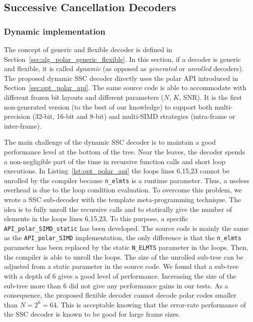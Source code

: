 \subsection{Successive Cancellation Decoders}

\subsubsection{Dynamic implementation}

The concept of generic and flexible decoder is defined in
Section~\ref{sec:alg_polar_generic_flexible}. In this section, if a decoder is
generic and flexible, it is called \emph{dynamic} (as opposed as
\emph{generated} or \emph{unrolled} decoders). The proposed dynamic SSC decoder
directly uses the polar API introduced in Section~\ref{sec:opt_polar_api}. The
same source code is able to accommodate with different frozen bit layouts and
different parameters ($N$, $K$, SNR). It is the first non-generated version (to
the best of our knowledge) to support both multi-precision (32-bit, 16-bit and
8-bit) and multi-SIMD strategies (intra-frame or inter-frame).

The main challenge of the dynamic SSC decoder is to maintain a good performance
level at the bottom of the tree. Near the leaves, the decoder spends a
non-negligible part of the time in recursive function calls and short loop
executions. In Listing~\ref{lst:opt_polar_api} the loops lines 6,15,23 cannot
be unrolled by the compiler because \verb|n_elmts| is a runtime parameter. Thus,
a useless overhead is due to the loop condition evaluation. To overcome this
problem, we wrote a SSC sub-decoder with the template meta-programming
technique. The idea is to fully unroll the recursive calls and to statically
give the number of elements in the loops lines 6,15,23. To this purpose, a
specific \verb|API_polar_SIMD_static| has been developed. The source code is
mainly the same as the \verb|API_polar_SIMD| implementation, the only difference
is that the \verb|n_elmts| parameter has been replaced by the static
\verb|N_ELMTS| parameter in the loops. Then, the compiler is able to unroll
the loops. The size of the unrolled sub-tree can be adjusted from a static
parameter in the source code. We found that a sub-tree with a depth of 6 gives
a good level of performance. Increasing the size of the sub-tree more than 6 did
not give any performance gains in our tests. As a consequence, the proposed
flexible decoder cannot decode polar codes smaller than $N = 2^6 = 64$. This is
acceptable knowing that the error-rate performance of the SSC decoder is known
to be good for large frame sizes.

